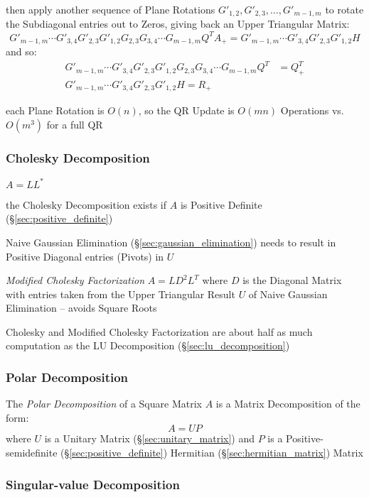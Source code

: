 then apply another sequence of Plane Rotations $G'_{1,2}, G'_{2,3}, \ldots,
G'_{m-1,m}$ to rotate the Subdiagonal entries out to Zeros, giving back an
Upper Triangular Matrix:
\[
  G'_{m-1,m}\cdots G'_{3,4}G'_{2,3}G'_{1,2}G_{2,3}G_{3,4}\cdots G_{m-1,m}
    Q^T A_+ =
  G'_{m-1,m}\cdots G'_{3,4}G'_{2,3}G'_{1,2}H
\]
and so:
\begin{align*}
  G'_{m-1,m}\cdots G'_{3,4}G'_{2,3}G'_{1,2}G_{2,3}G_{3,4}\cdots G_{m-1,m} Q^T
    & = Q_+^T \\
  G'_{m-1,m}\cdots G'_{3,4}G'_{2,3}G'_{1,2}H = R_+
\end{align*}

each Plane Rotation is $O(n)$, so the QR Update is $O(mn)$ Operations vs.
$O(m^3)$ for a full QR



\subsubsection{Cholesky Decomposition}\label{sec:cholesky_decomposition}

$A = LL^*$

the Cholesky Decomposition exists if $A$ is Positive Definite
(\S\ref{sec:positive_definite})

Naive Gaussian Elimination (\S\ref{sec:gaussian_elimination}) needs to result
in Positive Diagonal entries (Pivots) in $U$

\emph{Modified Cholesky Factorization} $A = L D^2 L^T$ where $D$ is the
Diagonal Matrix with entries taken from the Upper Triangular Result $U$ of
Naive Gaussian Elimination -- avoids Square Roots

Cholesky and Modified Cholesky Factorization are about half as much computation
as the LU Decomposition (\S\ref{sec:lu_decomposition})



\subsubsection{Polar Decomposition}\label{sec:polar_decomposition}

The \emph{Polar Decomposition} of a Square Matrix $A$ is a Matrix Decomposition
of the form:
\[
  A = U P
\]
where $U$ is a Unitary Matrix (\S\ref{sec:unitary_matrix}) and $P$ is a
Positive-semidefinite (\S\ref{sec:positive_definite}) Hermitian
(\S\ref{sec:hermitian_matrix}) Matrix



\subsubsection{Singular-value Decomposition}\label{sec:svd}

